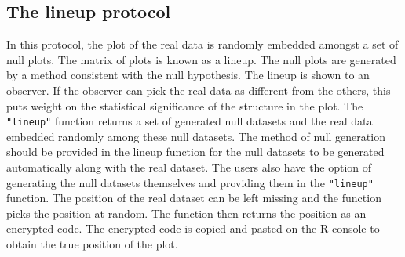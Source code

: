 \documentclass[article]{jss}
\begin{document}
\subsection{The lineup protocol}\label{the-lineup-protocol}

In this protocol, the plot of the real data is randomly embedded amongst
a set of null plots. The matrix of plots is known as a lineup. The null
plots are generated by a method consistent with the null hypothesis. The
lineup is shown to an observer. If the observer can pick the real data
as different from the others, this puts weight on the statistical
significance of the structure in the plot. The \texttt{"lineup"}
function returns a set of generated null datasets and the real data
embedded randomly among these null datasets. The method of null
generation should be provided in the lineup function for the null
datasets to be generated automatically along with the real dataset. The
users also have the option of generating the null datasets themselves
and providing them in the \texttt{"lineup"} function. The position of
the real dataset can be left missing and the function picks the position
at random. The function then returns the position as an encrypted code.
The encrypted code is copied and pasted on the R console to obtain the
true position of the plot.
\end{document}
